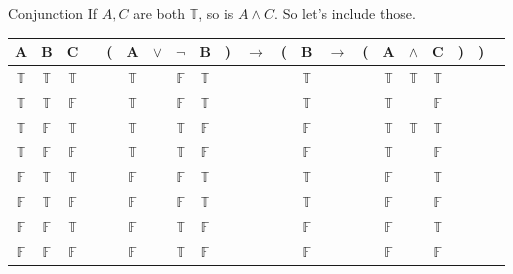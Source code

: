 \documentclass[
  ignorenonframetext,
]{beamer}
\renewcommand{\,}{\text{, }}
\def\True{\mathbb{T}}
\def\False{\mathbb{F}}
\begin{document}
\begin{frame}{Conjunction}
\protect\hypertarget{conjunction}{}
If \(A, C\) are both \(\True\), so is \(A \wedge C\). So let's include
those.

\begin{center}
\begin{tabular}{@{ }c@{ }@{ }c@{ }@{ }c | c@{ }@{}c@{}@{ }c@{ }@{ }c@{ }@{ }c@{ }@{ }c@{ }@{}c@{}@{ }c@{ }@{}c@{}@{ }c@{ }@{ }c@{ }@{}c@{}@{ }c@{ }@{ }c@{ }@{ }c@{ }@{}c@{}@{}c@{}@{ }c}
A & B & C &  & ( & A & $\vee$ & $\neg$ & B & ) & $\rightarrow$ & ( & B & $\rightarrow$ & ( & A & $\wedge$ & C & ) & ) & \\
\hline 
 $\True$ & $\True$ & $\True$ &  &  & $\True$ && $\False$ & $\True$ &  &&  & $\True$ &&  & $\True$ & $\True$ & $\True$ &  &  & \\
 $\True$ & $\True$ & $\False$ &  &  & $\True$ && $\False$ & $\True$ &  &&  & $\True$ &&  & $\True$ && $\False$ &  &  & \\
 $\True$ & $\False$ & $\True$ &  &  & $\True$ && $\True$ & $\False$ &  &&  & $\False$ &&  & $\True$ & $\True$ & $\True$ &  &  & \\
 $\True$ & $\False$ & $\False$ &  &  & $\True$ && $\True$ & $\False$ &  &&  & $\False$ &&  & $\True$ && $\False$ &  &  & \\
 $\False$ & $\True$ & $\True$ &  &  & $\False$ && $\False$ & $\True$ &  &&  & $\True$ &&  & $\False$ && $\True$ &  &  & \\
 $\False$ & $\True$ & $\False$ &  &  & $\False$ && $\False$ & $\True$ &  &&  & $\True$ &&  & $\False$ && $\False$ &  &  & \\
 $\False$ & $\False$ & $\True$ &  &  & $\False$ && $\True$ & $\False$ &  &&  & $\False$ &&  & $\False$ && $\True$ &  &  & \\
 $\False$ & $\False$ & $\False$ &  &  & $\False$ && $\True$ & $\False$ &  &&  & $\False$ &&  & $\False$ && $\False$ &  &  & \\
\end{tabular}
\end{center}
\end{frame}
\end{document}

